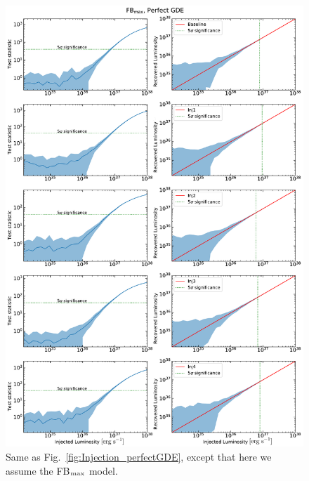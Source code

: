 \documentclass[doublespace,nopageskip]{VTthesis} %
\begin{document}
\begin{figure}
    \begin{center}
    \includegraphics[scale = 0.42]{Figures/CTA/all-TS-mis-False-Fermi-min-False.pdf}
    \caption{Same as Fig.~\ref{fig:Injection_perfectGDE}, except that here we assume the FB$_{\rm max}$ model.}\label{fig:Injection_perfectGDEFBmax}
    \end{center}
\end{figure}
\end{document}
